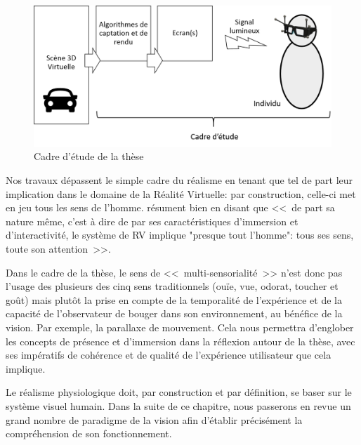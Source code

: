 	\begin{figure}
		\centering
		\includegraphics[scale=.65]{Figures/CadreEtude}
		\caption{Cadre d'étude de la thèse}
		\label{fig:champ_d_etude_these}
	\end{figure}
	
	\par Nos travaux dépassent le simple cadre du réalisme en tenant que tel de part leur implication dans le domaine de la Réalité Virtuelle: par construction, celle-ci met en jeu tous les sens de l'homme. \citep{burdea_realite_1993} résument bien en disant que <<~de part sa nature même, c'est à dire de par ses caractéristiques d'immersion et d'interactivité, le système de RV implique "presque tout l'homme": tous ses sens, toute son attention~>>.
	
	\par Dans le cadre de la thèse, le sens de <<~multi-sensorialité~>> n'est donc pas l'usage des plusieurs des cinq sens traditionnels (ouïe, vue, odorat, toucher et goût) mais plutôt la prise en compte de la temporalité de l'expérience et de la capacité de l'observateur de bouger dans son environnement, au bénéfice de la vision. Par exemple, la parallaxe de mouvement. Cela nous permettra d'englober les concepts de présence et d'immersion dans la réflexion autour de la thèse, avec ses impératifs de cohérence et de qualité de l'expérience utilisateur que cela implique.
	
	\par Le réalisme physiologique doit, par construction et par définition, se baser sur le système visuel humain. Dans la suite de ce chapitre, nous passerons en revue un grand nombre de paradigme de la vision afin d'établir précisément la compréhension de son fonctionnement.

